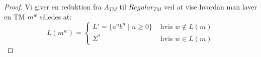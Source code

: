 \begin{proof}
	Vi giver en reduktion fra $A_{TM}$ til $Regular_{TM}$ ved at vise hvordan man laver en TM $m^{w}$ således at:
	\begin{equation*}
		L(m^{w}) = \begin{cases}
			L' = \{a^{n}b^{n} \mid n \ge 0\} & \text{ hvis } w \notin L(m) \\
			\Sigma^{*}                       & \text{ hvis } w \in L(m)
		\end{cases}
	\end{equation*}
\end{proof}

